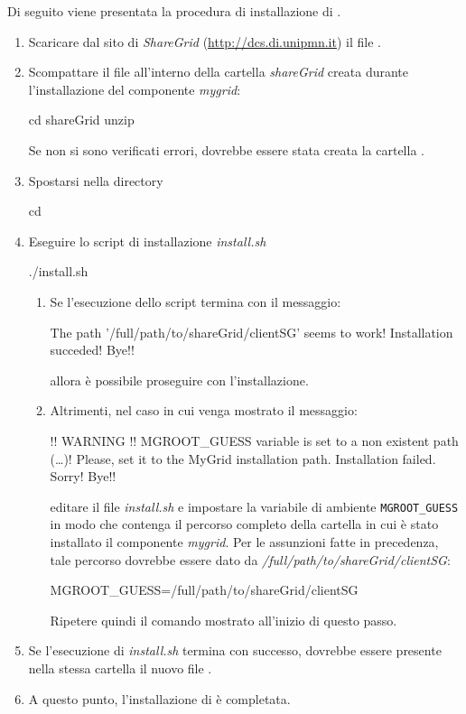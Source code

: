 Di seguito viene presentata la procedura di installazione di \mgTheApp{}.
\begin{enumerate}
\item Scaricare dal sito di \emph{ShareGrid} (\href{http://dcs.di.unipmn.it}{http://dcs.di.unipmn.it}) il file .
\item Scompattare il file all'interno della cartella \emph{shareGrid} creata durante l'installazione del componente \emph{mygrid}:
\begin{mgCodeBox}
cd shareGrid \newline
unzip 
\end{mgCodeBox}
Se non si sono verificati errori, dovrebbe essere stata creata la cartella \mgTheApp{}.
\item Spostarsi nella directory \mgTheApp{}
\begin{mgCodeBox}
cd \mgTheApp{}
\end{mgCodeBox}
\item Eseguire lo script di installazione \emph{install.sh}
\begin{mgCodeBox}
./install.sh
\end{mgCodeBox}
\begin{enumerate}
\item Se l'esecuzione dello script termina con il messaggio:
\begin{mgCodeBox}
The path '/full/path/to/shareGrid/clientSG' seems to work! \newline
Installation succeded! \newline
Bye!!
\end{mgCodeBox}
allora \`e possibile proseguire con l'installazione.
\item Altrimenti, nel caso in cui venga mostrato il messaggio:
\begin{mgCodeBox}
!! WARNING !! \newline
MGROOT\_GUESS variable is set to a non existent path (\dots)! \newline
Please, set it to the MyGrid installation path. \newline
Installation failed. Sorry! \newline
Bye!!
\end{mgCodeBox}
editare il file \emph{install.sh} e impostare la variabile di ambiente \texttt{MGROOT\_GUESS} in modo che contenga il percorso completo della cartella in cui \`e stato installato il componente \emph{mygrid}. Per le assunzioni fatte in precedenza, tale percorso dovrebbe essere dato da \emph{/full/path/to/shareGrid/clientSG}: 
\begin{mgCodeBox}
MGROOT\_GUESS=/full/path/to/shareGrid/clientSG
\end{mgCodeBox}
Ripetere quindi il comando mostrato all'inizio di questo passo.
\end{enumerate}
\item Se l'esecuzione di \emph{install.sh} termina con successo, dovrebbe essere presente nella stessa cartella il nuovo file .
\item A questo punto, l'installazione di \mgTheApp{} \`e completata.
\end{enumerate}

